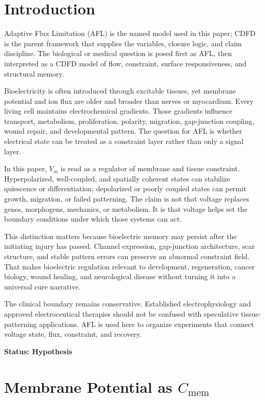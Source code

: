 \documentclass[12pt,a4paper]{article}
\begin{document}
\section{Introduction}

Adaptive Flux Limitation (AFL) is the named model used in this paper; CDFD is the parent framework that supplies the variables, closure logic, and claim discipline. The biological or medical question is posed first as AFL, then interpreted as a CDFD model of flow, constraint, surface responsiveness, and structural memory.

Bioelectricity is often introduced through excitable tissues, yet membrane potential and ion flux are older and broader than nerves or myocardium. Every living cell maintains electrochemical gradients. Those gradients influence transport, metabolism, proliferation, polarity, migration, gap-junction coupling, wound repair, and developmental pattern. The question for AFL is whether electrical state can be treated as a constraint layer rather than only a signal layer.

In this paper, $V_m$ is read as a regulator of membrane and tissue constraint. Hyperpolarized, well-coupled, and spatially coherent states can stabilize quiescence or differentiation; depolarized or poorly coupled states can permit growth, migration, or failed patterning. The claim is not that voltage replaces genes, morphogens, mechanics, or metabolism. It is that voltage helps set the boundary conditions under which those systems can act.

This distinction matters because bioelectric memory may persist after the initiating injury has passed. Channel expression, gap-junction architecture, scar structure, and stable pattern errors can preserve an abnormal constraint field. That makes bioelectric regulation relevant to development, regeneration, cancer biology, wound healing, and neurological disease without turning it into a universal cure narrative.

The clinical boundary remains conservative. Established electrophysiology and approved electroceutical therapies should not be confused with speculative tissue-patterning applications. AFL is used here to organize experiments that connect voltage state, flux, constraint, and recovery.

\textbf{Status: Hypothesis}

\section{Membrane Potential as $C_{\mathrm{mem}}$}
\end{document}

